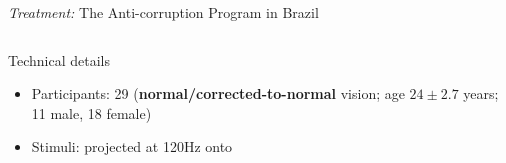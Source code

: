 \begin{frame}{\textit{Treatment:} The Anti-corruption Program in Brazil}
\begin{columns}
\begin{column}{0.4\textwidth}
    
    \end{column}
    \end{columns}
    \end{frame}
    

    \begin{frame}{Technical details}
        \begin{itemize}
            \item<+-> Participants: 29 (\textcolor{lightlavender}{\textbf{normal/corrected-to-normal}} vision; age $24\pm 2.7$ years; 11 male, 18 female)
            \item<+-> Stimuli: projected at 120Hz onto
        \end{itemize}
        
    \end{frame}


